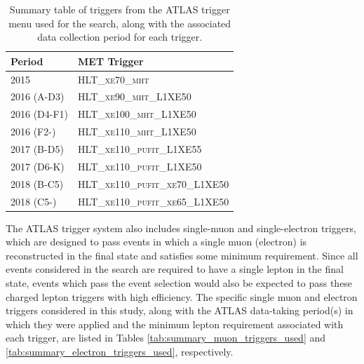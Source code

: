 \begin{table}[ht]
\caption{Summary table of \met triggers from the ATLAS trigger menu used for the search, along with the associated data collection period for each trigger.}
\label{tab:summary_triggers_used}
\footnotesize{
	\begin{center}
	\begin{tabular}{l l }
		\toprule
			\textbf{Period} & \textbf{MET Trigger} \\
			\midrule
			\midrule
			2015 & \textsc{HLT\_xe70\_mht} \\
			\midrule
			2016 (A-D3) & \textsc{HLT\_xe90\_mht\_L1XE50} \\
			\midrule
			2016 (D4-F1) & \textsc{HLT\_xe100\_mht\_L1XE50} \\
			\midrule
			2016 (F2-) & \textsc{HLT\_xe110\_mht\_L1XE50} \\
			\midrule
			2017 (B-D5) & \textsc{HLT\_xe110\_pufit\_L1XE55} \\
			\midrule
			2017 (D6-K) & \textsc{HLT\_xe110\_pufit\_L1XE50} \\
			\midrule
			2018 (B-C5) & \textsc{HLT\_xe110\_pufit\_xe70\_L1XE50} \\
			\midrule
			2018 (C5-) & \textsc{HLT\_xe110\_pufit\_xe65\_L1XE50} \\
		\bottomrule
	\end{tabular}
	\end{center}
	}
\end{table}

The ATLAS trigger system also includes single-muon and single-electron triggers, which are designed to pass events in which a single muon (electron) is reconstructed in the final state and satisfies some minimum \pt requirement. Since all events considered in the search are required to have a single lepton in the final state, events which pass the event selection would also be expected to pass these charged lepton triggers with high efficiency. The specific single muon and electron triggers considered in this study, along with the ATLAS data-taking period(s) in which they were applied and the minimum lepton \pt requirement associated with each trigger, are listed in Tables \ref{tab:summary_muon_triggers_used} and \ref{tab:summary_electron_triggers_used}, respectively.

